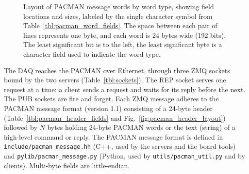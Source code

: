 \documentclass[12pt]{article}
\begin{document}
\begin{figure}[htbp]

  \caption{Layout of PACMAN message words by word type, showing field
    locations and sizes, labeled by the single character symbol from
    Table~\ref{tbl:pacman_word_fields}.  The space between each pair
    of lines represents one byte, and each word is 24 bytes wide
    (192 bits).  The least significant bit is to the left, the
    least significant byte is a character field used to indicate the
    word type.}
\label{fig:pacman_word_layouts}
\end{figure}

\noindent
The DAQ reaches the PACMAN over Ethernet, through three ZMQ sockets bound by the two servers
(Table~\ref{tbl:sockets}).  The REP socket serves one request at a time: a client sends a request
and waits for its reply before the next.  The PUB sockets are fire and forget.  Each ZMQ message
adheres to the PACMAN message format (version 1.1) consisting of a 24-byte header
(Table~\ref{tbl:pacman_header_fields} and Fig.~\ref{fig:pacman_header_layout}) followed by $N$ bytes
holding 24-byte PACMAN words or the text (string) of a high-level command or reply.  The PACMAN
message format is defined in \texttt{include/pacman\_message.hh} (C++, used by the servers and the
board tools) and \texttt{pylib/pacman\_message.py} (Python, used by \texttt{utils/pacman\_util.py}
and by clients).  Multi-byte fields are little-endian.
\end{document}
